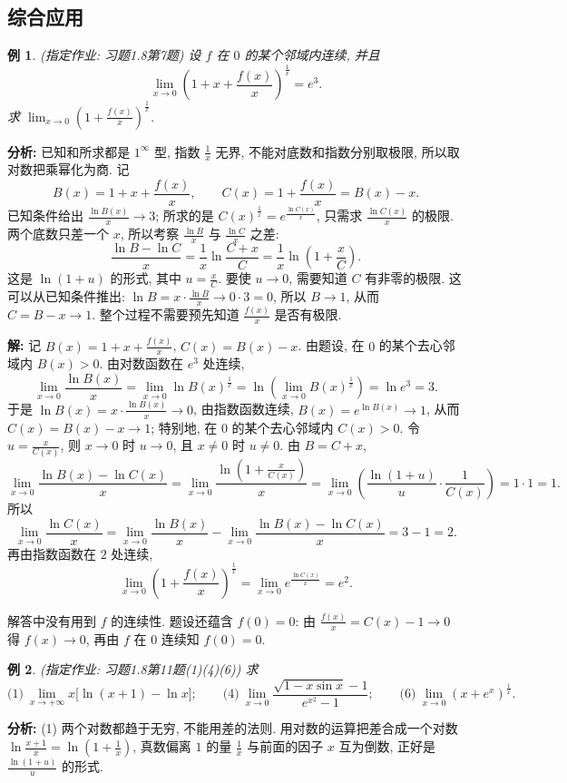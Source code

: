 \documentclass[UTF8,openany]{ctexbook}
\theoremstyle{chinesetextbook}
\newtheorem{example}{例}[section]
\newenvironment{cnsolution}{\par\indent\textbf{解:} \ignorespaces}{\par}
\begin{document}
\subsection{综合应用}
\begin{example}
\textnormal{(指定作业: 习题1.8第7题)} 设 $f$ 在 $0$ 的某个邻域内连续, 并且
\[
\lim_{x\to0}\left(1+x+\frac{f(x)}x\right)^{\frac1x}=e^3.
\]
求 $\displaystyle\lim_{x\to0}\left(1+\frac{f(x)}x\right)^{\frac1x}$.
\end{example}
\par\indent\textbf{分析:} 已知和所求都是 $1^\infty$ 型, 指数 $\displaystyle\frac1x$ 无界, 不能对底数和指数分别取极限, 所以取对数把乘幂化为商. 记
\[
B(x)=1+x+\frac{f(x)}x,\qquad C(x)=1+\frac{f(x)}x=B(x)-x.
\]
已知条件给出 $\displaystyle\frac{\ln B(x)}x\to3$; 所求的是 $\displaystyle C(x)^{\frac1x}=e^{\frac{\ln C(x)}x}$, 只需求 $\displaystyle\frac{\ln C(x)}x$ 的极限. 两个底数只差一个 $x$, 所以考察 $\displaystyle\frac{\ln B}x$ 与 $\displaystyle\frac{\ln C}x$ 之差:
\[
\frac{\ln B-\ln C}x=\frac1x\ln\frac{C+x}C=\frac1x\ln\left(1+\frac xC\right).
\]
这是 $\ln(1+u)$ 的形式, 其中 $\displaystyle u=\frac xC$. 要使 $u\to0$, 需要知道 $C$ 有非零的极限. 这可以从已知条件推出: $\displaystyle\ln B=x\cdot\frac{\ln B}x\to0\cdot3=0$, 所以 $B\to1$, 从而 $C=B-x\to1$. 整个过程不需要预先知道 $\displaystyle\frac{f(x)}x$ 是否有极限.
\begin{cnsolution}
记 $\displaystyle B(x)=1+x+\frac{f(x)}x$, $C(x)=B(x)-x$. 由题设, 在 $0$ 的某个去心邻域内 $B(x)>0$. 由对数函数在 $e^3$ 处连续,
\[
\lim_{x\to0}\frac{\ln B(x)}x=\lim_{x\to0}\ln B(x)^{\frac1x}=\ln\left(\lim_{x\to0}B(x)^{\frac1x}\right)=\ln e^3=3.
\]
于是 $\displaystyle\ln B(x)=x\cdot\frac{\ln B(x)}x\to0$, 由指数函数连续, $B(x)=e^{\ln B(x)}\to1$, 从而 $C(x)=B(x)-x\to1$; 特别地, 在 $0$ 的某个去心邻域内 $C(x)>0$. 令 $\displaystyle u=\frac x{C(x)}$, 则 $x\to0$ 时 $u\to0$, 且 $x\ne0$ 时 $u\ne0$. 由 $B=C+x$,
\[
\lim_{x\to0}\frac{\ln B(x)-\ln C(x)}x=\lim_{x\to0}\frac{\ln\left(1+\frac x{C(x)}\right)}x=\lim_{x\to0}\left(\frac{\ln(1+u)}u\cdot\frac1{C(x)}\right)=1\cdot1=1.
\]
所以
\[
\lim_{x\to0}\frac{\ln C(x)}x=\lim_{x\to0}\frac{\ln B(x)}x-\lim_{x\to0}\frac{\ln B(x)-\ln C(x)}x=3-1=2.
\]
再由指数函数在 $2$ 处连续,
\[
\lim_{x\to0}\left(1+\frac{f(x)}x\right)^{\frac1x}=\lim_{x\to0}e^{\frac{\ln C(x)}x}=e^2.
\]
\end{cnsolution}
解答中没有用到 $f$ 的连续性. 题设还蕴含 $f(0)=0$: 由 $\displaystyle\frac{f(x)}x=C(x)-1\to0$ 得 $f(x)\to0$, 再由 $f$ 在 $0$ 连续知 $f(0)=0$.
\begin{example}
\textnormal{(指定作业: 习题1.8第11题(1)(4)(6))} 求
\[
\text{(1)}\ \lim_{x\to+\infty}x\bigl[\ln(x+1)-\ln x\bigr];\qquad\text{(4)}\ \lim_{x\to0}\frac{\sqrt{1-x\sin x}-1}{e^{x^2}-1};\qquad\text{(6)}\ \lim_{x\to0}\left(x+e^x\right)^{\frac1x}.
\]
\end{example}
\par\indent\textbf{分析:} (1) 两个对数都趋于无穷, 不能用差的法则. 用对数的运算把差合成一个对数 $\displaystyle\ln\frac{x+1}x=\ln\left(1+\frac1x\right)$, 真数偏离 $1$ 的量 $\displaystyle\frac1x$ 与前面的因子 $x$ 互为倒数, 正好是 $\displaystyle\frac{\ln(1+u)}u$ 的形式.
\end{document}
